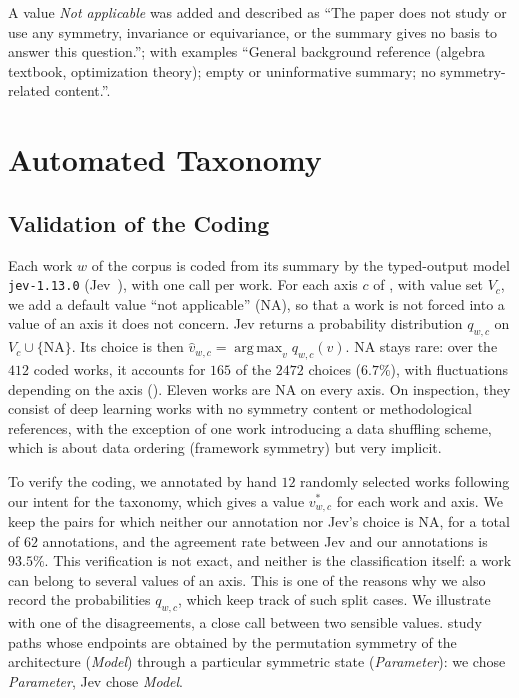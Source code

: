 \documentclass[mathematics,review,submit,moreauthors]{Definitions/mdpi}
\begin{document}
A value \emph{Not applicable} was added and described as ``The paper does not study or use any symmetry, invariance or equivariance, or the summary gives no basis to answer this question.''; with examples ``General background reference (algebra textbook, optimization theory); empty or uninformative summary; no symmetry-related content.''.

\pagebreak

\section{Automated Taxonomy}\label{app:automated-taxonomy}

\subsection{Validation of the Coding}\label{app:coding-validation}
Each work $w$ of the corpus is coded from its summary by the typed-output model \texttt{jev-1.13.0} (Jev~\citep{typesafe2026t}), with one call per work.
For each axis $c$ of , with value set $V_c$, we add a default value ``not applicable'' (NA), so that a work is not forced into a value of an axis it does not concern.
Jev returns a probability distribution $q_{w,c}$ on $V_c\cup\{\mathrm{NA}\}$.
Its choice is then $\hat v_{w,c}=\operatorname{arg\,max}_{v}q_{w,c}(v)$.
NA stays rare: over the $412$ coded works, it accounts for $165$ of the $2472$ choices ($6.7\%$), with fluctuations depending on the axis ().
Eleven works are NA on every axis.
On inspection, they consist of deep learning works with no symmetry content or methodological references, with the exception of one work \citep{xu2024vj} introducing a data shuffling scheme, which is about data ordering (framework symmetry) but very implicit.

To verify the coding, we annotated by hand $12$ randomly selected works following our intent for the taxonomy, which gives a value $v^*_{w,c}$ for each work and axis.
We keep the pairs for which neither our annotation nor Jev's choice is NA, for a total of $62$ annotations, and the agreement rate between Jev and our annotations is $93.5\%$.
This verification is not exact, and neither is the classification itself: a work can belong to several values of an axis.
This is one of the reasons why we also record the probabilities $q_{w,c}$, which keep track of such split cases.
We illustrate with one of the disagreements, a close call between two sensible values.
\citet{brea2019} study paths whose endpoints are obtained by the permutation symmetry of the architecture (\emph{Model}) through a particular symmetric state (\emph{Parameter}): we chose \emph{Parameter}, Jev chose \emph{Model}.
\end{document}

